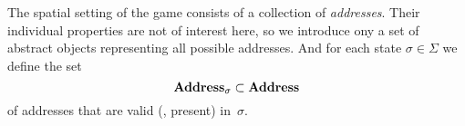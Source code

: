 The spatial setting of the game consists of a collection of {\em
  addresses}. Their individual properties are not of interest here, so
  we introduce ony a set \addressset{} of abstract objects representing
  all possible addresses. And for each state $\sigma \in \Sigma$ we
  define the set
\[ \textbf{Address}_{\sigma} \subset \textbf{Address}_{} \]
of addresses that are valid (\ie, present) in~$\sigma$.
